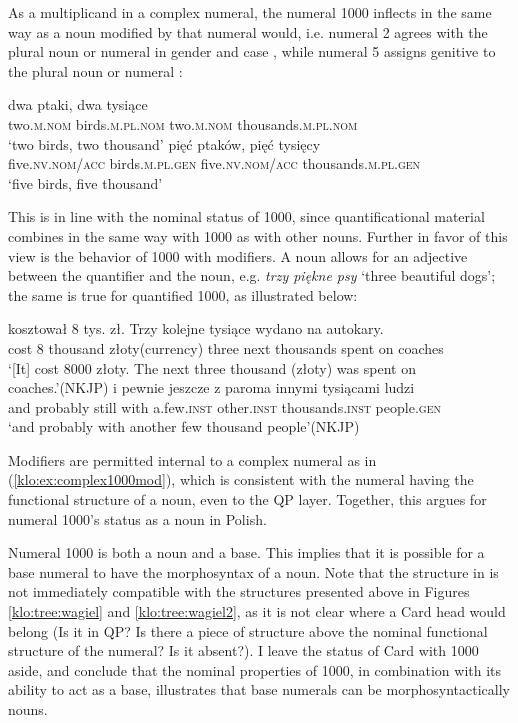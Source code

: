 \documentclass[output=paper]{langscibook}
\begin{document}
As a multiplicand in a complex numeral, the numeral 1000 inflects in the same way as a noun modified by that numeral would, i.e. numeral 2 agrees with the plural noun or numeral in gender and case , while numeral 5 assigns genitive to the plural noun or numeral :

\ea \label{klo:ex:num1000}
\ea \gll dwa ptaki, dwa tysiące\\
two.\textsc{m.nom} birds.\textsc{m.pl.nom} two.\textsc{m.nom} thousands.\textsc{m.pl.nom}\\
\glt `two birds, two thousand' \label{klo:ex:num1000a}
\ex \gll pięć ptaków, pięć tysięcy\\
five.\textsc{nv.nom/acc} birds.\textsc{m.pl.gen} five.\textsc{nv.nom/acc} thousands.\textsc{m.pl.gen}\hspace{-2pt}\\
\glt `five birds, five thousand'\label{klo:ex:num1000b}
\z \z %

\noindent This is in line with the nominal status of 1000, since quantificational material combines in the same way with 1000 as with other nouns. Further in favor of this view is the behavior of 1000 with modifiers. A noun allows for an adjective between the quantifier and the noun, e.g. \textit{trzy piękne psy} `three beautiful dogs'; the same is true for quantified 1000, as illustrated below:

\ea \label{klo:ex:mod1000}
\ea \gll {\dots} kosztował 8 tys. zł. Trzy kolejne tysiące wydano na autokary.\\
{} cost 8 thousand złoty(currency) three next thousands spent on coaches\\
\glt `[It] cost 8000 złoty. The next three thousand (złoty) was spent on coaches.'\hfill (NKJP) \label{klo:ex:complex1000mod}
\ex \gll {\dots} i pewnie jeszcze z paroma innymi tysiącami ludzi\\
{} and probably still with a.few.\textsc{inst} other.\textsc{inst} thousands.\textsc{inst} people.\textsc{gen}\\
\glt `and probably with another few thousand people'\hfill (NKJP)
\z \z %

\noindent Modifiers are permitted internal to a complex numeral as in (\ref{klo:ex:complex1000mod}), which is consistent with the numeral having the functional structure of a noun, even to the QP layer. Together, this argues for numeral 1000's status as a noun in Polish.

Numeral 1000 is both a noun and a base. This implies that it is possible for a base numeral to have the morphosyntax of a noun. Note that the structure in  is not immediately compatible with the structures presented above in Figures \ref{klo:tree:wagiel} and \ref{klo:tree:wagiel2}, as it is not clear where a Card head would belong (Is it in QP? Is there a piece of structure above the nominal functional structure of the numeral? Is it absent?). I leave the status of Card with 1000 aside, and conclude that the nominal properties of 1000, in combination with its ability to act as a base, illustrates that base numerals can be morphosyntactically nouns.
\end{document}
